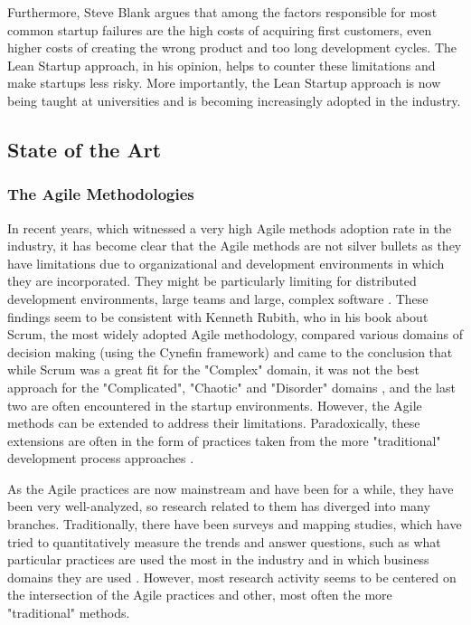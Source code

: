 \documentclass{article}
\begin{document}
Furthermore, Steve Blank argues that among the factors responsible for most common startup failures are the high costs of acquiring first customers, even higher costs of creating the wrong product and too long development cycles. The Lean Startup approach, in his opinion, helps to counter these limitations and make startups less risky. More importantly, the Lean Startup approach is now being taught at universities and is becoming increasingly adopted in the industry.

\subsection{State of the Art}
\subsubsection{The Agile Methodologies}
In recent years, which witnessed a very high Agile methods adoption rate in the industry, it has become clear that the Agile methods are not silver bullets as they have limitations due to organizational and development environments in which they are incorporated. They might be particularly limiting for distributed development environments, large teams and large, complex software \cite{turk2014assumptions}. These findings seem to be consistent with Kenneth Rubith, who in his book about Scrum, the most widely adopted Agile methodology, compared various domains of decision making (using the Cynefin framework) and came to the conclusion that while Scrum was a great fit for the "Complex" domain, it was not the best approach for the "Complicated", "Chaotic" and "Disorder" domains \cite{rubin2012essential}, and the last two are often encountered in the startup environments. However, the Agile methods can be extended to address their limitations. Paradoxically, these extensions are often in the form of practices taken from the more "traditional" development process approaches \cite{turk2014limitations}.

As the Agile practices are now mainstream and have been for a while, they have been very well-analyzed, so research related to them has diverged into many branches. Traditionally, there have been surveys and mapping studies, which have tried to quantitatively measure the trends and answer questions, such as what particular practices are used the most in the industry and in which business domains they are used \cite{diebold2014Agile}. However, most research activity seems to be centered on the intersection of the Agile practices and other, most often the more "traditional" methods.
\end{document}
